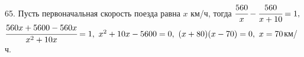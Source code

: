 65. Пусть первоначальная скорость поезда равна $x$ км/ч, тогда $\cfrac{560}{x}-\cfrac{560}{x+10}=1,$\\$ \cfrac{560x+5600-560x}{x^2+10x}=1,\ x^2+10x-5600=0,\
(x+80)(x-70)=0,\ x=70$км/ч.\\
